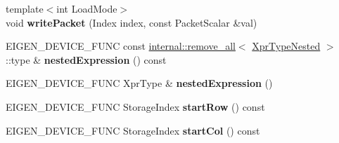 \begin{DoxyCompactItemize}
{\footnotesize template$<$int Load\+Mode$>$ }\\void {\bfseries write\+Packet} (Index index, const Packet\+Scalar \&val)
\item 
\mbox{\label{class_eigen_1_1internal_1_1_block_impl__dense_a0787c7ed9ab44398bda9ce26f4ed2917}} 
E\+I\+G\+E\+N\+\_\+\+D\+E\+V\+I\+C\+E\+\_\+\+F\+U\+NC const \mbox{\hyperlink{struct_eigen_1_1internal_1_1remove__all}{internal\+::remove\+\_\+all}}$<$ \mbox{\hyperlink{struct_eigen_1_1internal_1_1true__type}{Xpr\+Type\+Nested}} $>$\+::type \& {\bfseries nested\+Expression} () const
\item 
\mbox{\label{class_eigen_1_1internal_1_1_block_impl__dense_a286c3b51a17651242aea9c6ae44991d5}} 
E\+I\+G\+E\+N\+\_\+\+D\+E\+V\+I\+C\+E\+\_\+\+F\+U\+NC Xpr\+Type \& {\bfseries nested\+Expression} ()
\item 
\mbox{\label{class_eigen_1_1internal_1_1_block_impl__dense_a66b5ab9ca60354d0ccf089b45845fc35}} 
E\+I\+G\+E\+N\+\_\+\+D\+E\+V\+I\+C\+E\+\_\+\+F\+U\+NC Storage\+Index {\bfseries start\+Row} () const
\item 
\mbox{\label{class_eigen_1_1internal_1_1_block_impl__dense_afa5798a61fe753fb0ded7ec54b3d0812}} 
E\+I\+G\+E\+N\+\_\+\+D\+E\+V\+I\+C\+E\+\_\+\+F\+U\+NC Storage\+Index {\bfseries start\+Col} () const
\end{DoxyCompactItemize}
